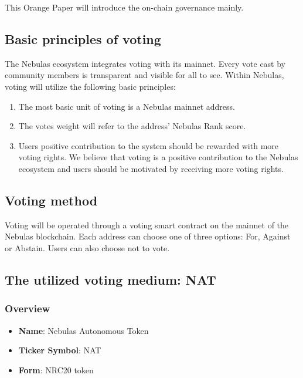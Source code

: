 This Orange Paper will introduce the on-chain governance mainly.

\subsection{Basic principles of voting}

The Nebulas ecosystem integrates voting with its mainnet. Every vote cast by community members is transparent and visible for all to see. Within Nebulas, voting will utilize the following basic principles:

\begin{enumerate}
	\item The most basic unit of voting is a Nebulas mainnet address.
	\item The votes weight will refer to the address' Nebulas Rank score.
	\item Users positive contribution to the system should be rewarded with more voting rights. We believe that voting is a positive contribution to the Nebulas ecosystem and users should be motivated by receiving more voting rights.
\end{enumerate}

\subsection{Voting method}

Voting will be operated through a voting smart contract on the mainnet of the Nebulas blockchain. Each address can choose one of three options: For, Against or Abstain. Users can also choose not to vote.

\subsection{The utilized voting medium: NAT}

\label{nat}

\subsubsection{Overview}

\begin{itemize}
	\item \textbf{Name}: Nebulas Autonomous Token
	\item \textbf{Ticker Symbol}: NAT
	\item \textbf{Form}: NRC20 token
\end{itemize}

